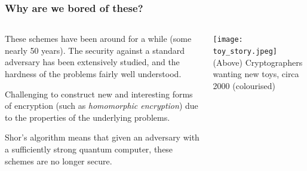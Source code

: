 \documentclass[
aspectratio=169, %
t, %
onlytextwidth, %
10pt, %
]{beamer}
\begin{document}
\begin{frame}
    \frametitle{Why are we bored of these?}
    \begin{columns}[T] %
        \begin{column}{0.48\linewidth} %
            These schemes have been around for a while (some nearly 50 years). The security against a standard adversary has been extensively studied, and the hardness of the problems fairly well understood.

            Challenging to construct new and interesting forms of encryption (such as \textit{homomorphic encryption}) due to the properties of the underlying problems.

            Shor's algorithm means that given an adversary with a sufficiently strong quantum computer, these schemes are no longer secure.
        \end{column}
        \begin{column}{0.48\linewidth} %
            \texttt{[image: toy\_story.jpeg]} %
            {\tiny\textcolor{ICLBlue}{(Above) Cryptographers wanting new toys, circa 2000 (colourised)}}
        \end{column}
    \end{columns}
\end{frame}

\end{document}
